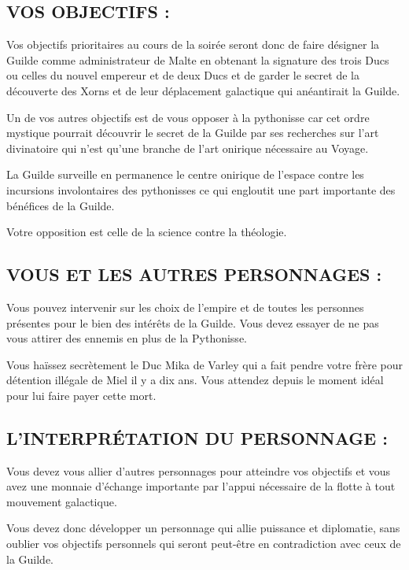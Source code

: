 \documentclass[14pt,twocolumn]{extarticle}
\begin{document}
\subsection{VOS OBJECTIFS :}

Vos objectifs prioritaires au cours de la soirée seront donc de faire désigner
la Guilde comme administrateur de Malte en obtenant la signature des trois Ducs
ou celles du nouvel empereur et de deux Ducs et de garder le secret de la
découverte des Xorns et de leur déplacement galactique qui anéantirait la
Guilde.

Un de vos autres objectifs est de vous opposer à la pythonisse car cet ordre
mystique pourrait découvrir le secret de la Guilde par ses recherches sur l'art
divinatoire qui n'est qu'une branche de l'art onirique nécessaire au Voyage.

La Guilde surveille en permanence le centre onirique de l'espace contre les
incursions involontaires des pythonisses ce qui engloutit une part importante
des bénéfices de la Guilde.

Votre opposition est celle de la science contre la théologie.

\subsection{VOUS ET LES AUTRES PERSONNAGES :}

Vous pouvez intervenir sur les choix de l'empire et de toutes les personnes
présentes pour le bien des intérêts de la Guilde. Vous devez essayer de ne pas
vous attirer des ennemis en plus de la Pythonisse.

Vous haïssez secrètement le Duc Mika de Varley qui a fait pendre votre frère
pour détention illégale de Miel il y a dix ans. Vous attendez depuis le moment
idéal pour lui faire payer cette mort.

\subsection{L'INTERPRÉTATION DU PERSONNAGE :}

Vous devez vous allier d'autres personnages pour atteindre vos objectifs et
vous avez une monnaie d'échange importante par l'appui nécessaire de la flotte
à tout mouvement galactique.

Vous devez donc développer un personnage qui allie puissance et diplomatie,
sans oublier vos objectifs personnels qui seront peut-être en contradiction
avec ceux de la Guilde.
\end{document}
